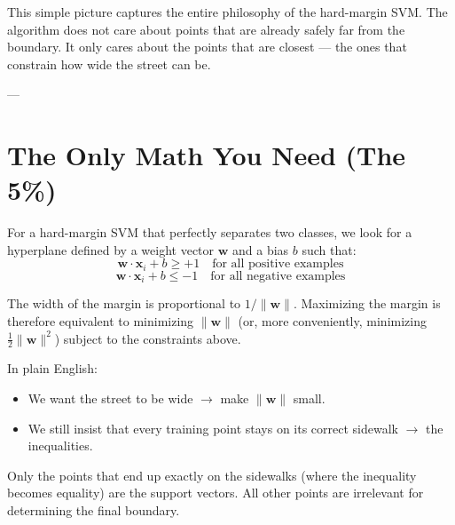 \documentclass[11pt,journal,onecolumn]{IEEEtran}
\begin{document}
This simple picture captures the entire philosophy of the hard-margin SVM. The algorithm does not care about points that are already safely far from the boundary. It only cares about the points that are closest --- the ones that constrain how wide the street can be.

---

\section{The Only Math You Need (The 5\%)}
\label{sec:math}

For a hard-margin SVM that perfectly separates two classes, we look for a hyperplane defined by a weight vector $\mathbf{w}$ and a bias $b$ such that:
\begin{equation}
\mathbf{w} \cdot \mathbf{x}_i + b \geq +1 \quad \text{for all positive examples}
\end{equation}
\begin{equation}
\mathbf{w} \cdot \mathbf{x}_i + b \leq -1 \quad \text{for all negative examples}
\end{equation}

The width of the margin is proportional to $1 / \|\mathbf{w}\|$. Maximizing the margin is therefore equivalent to minimizing $\|\mathbf{w}\|$ (or, more conveniently, minimizing $\frac{1}{2}\|\mathbf{w}\|^2$) subject to the constraints above.

In plain English:
\begin{itemize}
    \item We want the street to be wide $\rightarrow$ make $\|\mathbf{w}\|$ small.
    \item We still insist that every training point stays on its correct sidewalk $\rightarrow$ the inequalities.
\end{itemize}

Only the points that end up exactly on the sidewalks (where the inequality becomes equality) are the support vectors. All other points are irrelevant for determining the final boundary.

\vspace{0.3em}
\noindent{}
\vspace{0.3em}
\end{document}
